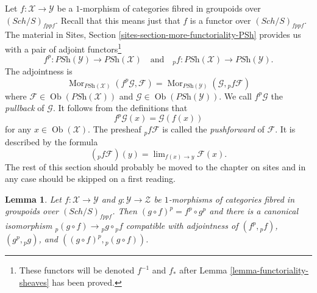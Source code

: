 \documentclass{stacks-project}
\theoremstyle{plain}
\newtheorem{lemma}[subsection]{Lemma}
\theoremstyle{definition}
\theoremstyle{remark}
\numberwithin{equation}{subsection}
\def\lim{\mathop{\mathrm{lim}}\nolimits}
\def\Sch{\mathit{Sch}}
\def\Mor{\mathop{\mathrm{Mor}}\nolimits}
\def\Ob{\mathop{\mathrm{Ob}}\nolimits}
\begin{document}
\medskip\noindent
Let $f : \mathcal{X} \to \mathcal{Y}$ be a $1$-morphism of categories
fibred in groupoids over $(\Sch/S)_{fppf}$. Recall that this
means just that $f$ is a functor over $(\Sch/S)_{fppf}$.
The material in
Sites, Section \ref{sites-section-more-functoriality-PSh}
provides us with a pair of adjoint functors\footnote{These functors
will be denoted $f^{-1}$ and $f_*$ after
Lemma \ref{lemma-functoriality-sheaves}
has been proved.}
\begin{equation}
\label{equation-pushforward-pullback}
f^p : \textit{PSh}(\mathcal{Y}) \longrightarrow \textit{PSh}(\mathcal{X})
\quad\text{and}\quad
{}_pf : \textit{PSh}(\mathcal{X}) \longrightarrow \textit{PSh}(\mathcal{Y}).
\end{equation}
The adjointness is
$$
\Mor_{\textit{PSh}(\mathcal{X})}(f^p\mathcal{G}, \mathcal{F})
=
\Mor_{\textit{PSh}(\mathcal{Y})}(\mathcal{G}, {}_pf\mathcal{F})
$$
where $\mathcal{F} \in \Ob(\textit{PSh}(\mathcal{X}))$ and
$\mathcal{G} \in \Ob(\textit{PSh}(\mathcal{Y}))$. We call
$f^p\mathcal{G}$ the {\it pullback} of $\mathcal{G}$. It follows
from the definitions that
$$
f^p\mathcal{G}(x) = \mathcal{G}(f(x))
$$
for any $x \in \Ob(\mathcal{X})$. The presheaf ${}_pf\mathcal{F}$
is called the {\it pushforward} of $\mathcal{F}$. It is described
by the formula
$$
({}_pf\mathcal{F})(y) = \lim_{f(x) \to y} \mathcal{F}(x).
$$
The rest of this section should probably be moved to the chapter
on sites and in any case should be skipped on a first reading.

\begin{lemma}
\label{lemma-1-morphisms-presheaves}
Let $f : \mathcal{X} \to \mathcal{Y}$ and $g : \mathcal{Y} \to \mathcal{Z}$
be $1$-morphisms of categories fibred in groupoids over
$(\Sch/S)_{fppf}$. Then $(g \circ f)^p = f^p \circ g^p$ and
there is a canonical isomorphism
${}_p(g \circ f) \to {}_pg \circ {}_pf$
compatible with adjointness of $(f^p, {}_pf)$, $(g^p, {}_pg)$, and
$((g \circ f)^p, {}_p(g \circ f))$.
\end{lemma}
\end{document}
